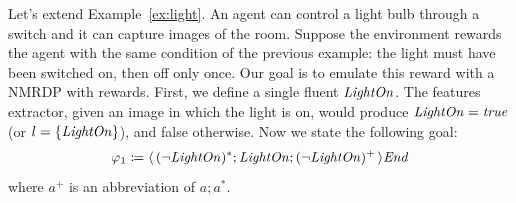 \begin{example}
	Let's extend Example~\ref{ex:light}. An agent can control a light bulb
	through a switch and it can capture images of the room. Suppose the
	environment rewards the agent with the same condition of the previous
	example: the light must have been switched on, then off only once.
	Our goal is to emulate this reward with a NMRDP with \ldl{} rewards.
	First, we define a single fluent $\text{\textit{LightOn}}$. The features extractor,
	given an image in which the light is on, would produce $\text{\textit{LightOn}} =
	\text{\textit{true}}$ (or $l = \{\text{\textit{LightOn}}\}$), and false otherwise. Now we state
	the following \ldl{} goal:
	\[
		\varphi_1 \coloneqq \langle\, {(\neg \text{\textit{LightOn}})^*; \text{\textit{LightOn}};
		(\neg \text{\textit{LightOn}})^+} \,\rangle \text{\textit{End}}
	\]
	where $a^+$ is an abbreviation of $a; a^*$.
	\label{ex:rb-light}
\end{example}

